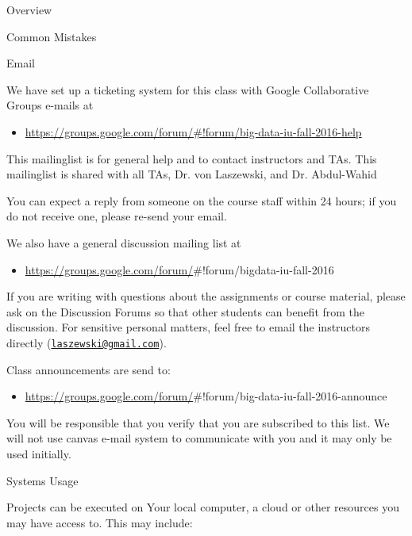 \begin{edXchapter}{Overview}
\begin{edXsection}{Common Mistakes}
\end{edXsection}
\begin{edXsection}{Email}\label{email}

We have set up a ticketing system for this class with Google
Collaborative Groups e-mails at

\begin{itemize}
\itemsep1pt\parskip0pt
\item
  \url{https://groups.google.com/forum/#!forum/big-data-iu-fall-2016-help}
\end{itemize}

This mailinglist is for general help and to contact instructors and TAs.
This mailinglist is shared with all TAs, Dr. von Laszewski, and Dr.
Abdul-Wahid

You can expect a reply from someone on the course staff within 24 hours;
if you do not receive one, please re-send your email.

We also have a general discussion mailing list at

\begin{itemize}
\itemsep1pt\parskip0pt
\item
  \url{https://groups.google.com/forum/}\#!forum/bigdata-iu-fall-2016
\end{itemize}

If you are writing with questions about the assignments or course
material, please ask on the Discussion Forums so that other students can
benefit from the discussion. For sensitive personal matters, feel free
to email the instructors directly
(\href{mailto:laszewski@gmail.com}{\nolinkurl{laszewski@gmail.com}}).

Class announcements are send to:

\begin{itemize}
\itemsep1pt\parskip0pt
\item
  \url{https://groups.google.com/forum/}\#!forum/big-data-iu-fall-2016-announce
\end{itemize}

You will be responsible that you verify that you are subscribed to this
list. We will not use canvas e-mail system to communicate with you and
it may only be used initially.

\end{edXsection}
\begin{edXsection}{Systems Usage}\label{systems-usage}

Projects can be executed on Your local computer, a cloud or other
resources you may have access to. This may include:


\end{edXsection}
\end{edXchapter}
